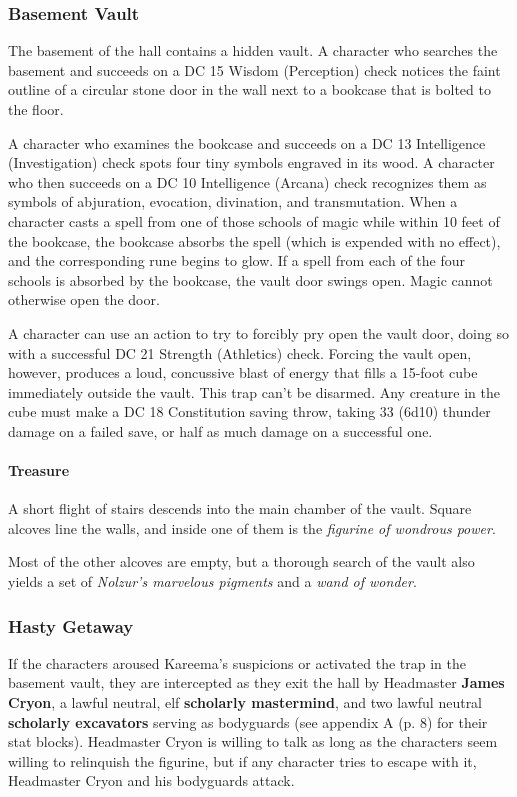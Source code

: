 \documentclass[a4paper, 11pt, bg=full, twocolumn, nooutline]{dndbook}
\begin{document}
\subsubsection{Basement Vault}

The basement of the hall contains a hidden vault. A character who searches the basement and succeeds on a DC 15 Wisdom (Perception) check notices the faint outline of a circular stone door in the wall next to a bookcase that is bolted to the floor.

A character who examines the bookcase and succeeds on a DC 13 Intelligence (Investigation) check spots four tiny symbols engraved in its wood. A character who then succeeds on a DC 10 Intelligence (Arcana) check recognizes them as symbols of abjuration, evocation, divination, and transmutation. When a character casts a spell from one of those schools of magic while within 10 feet of the bookcase, the bookcase absorbs the spell (which is expended with no effect), and the corresponding rune begins to glow. If a spell from each of the four schools is absorbed by the bookcase, the vault door swings open. Magic cannot otherwise open the door.

A character can use an action to try to forcibly pry open the vault door, doing so with a successful DC 21 Strength (Athletics) check. Forcing the vault open, however, produces a loud, concussive blast of energy that fills a 15-foot cube immediately outside the vault. This trap can't be disarmed. Any creature in the cube must make a DC 18 Constitution saving throw, taking 33 (6d10) thunder damage on a failed save, or half as much damage on a successful one.

\paragraph{Treasure}

A short flight of stairs descends into the main chamber of the vault. Square alcoves line the walls, and inside one of them is the \textit{figurine of wondrous power}.

Most of the other alcoves are empty, but a thorough search of the vault also yields a set of \textit{Nolzur's marvelous pigments} and a \textit{wand of wonder}.

\subsubsection{Hasty Getaway}

If the characters aroused Kareema's suspicions or activated the trap in the basement vault, they are intercepted as they exit the hall by Headmaster \textbf{James Cryon}, a lawful neutral, elf \textbf{scholarly mastermind}, and two lawful neutral \textbf{scholarly excavators} serving as bodyguards (see appendix A (p. 8) for their stat blocks). Headmaster Cryon is willing to talk as long as the characters seem willing to relinquish the figurine, but if any character tries to escape with it, Headmaster Cryon and his bodyguards attack.
\end{document}
